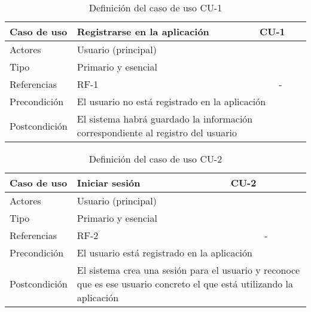 \begin{table}[H]
    \begin{tabular}{|p{3cm}|p{5cm}|p{2cm}|}
        \hline
        Caso de uso & Registrarse en la aplicación & CU-1 \\
        \hline
        Actores & \multicolumn{2}{|p{7cm}|}{Usuario (principal)} \\
        \hline
        Tipo & \multicolumn{2}{|p{7cm}|}{Primario y esencial} \\
        \hline
        Referencias & RF-1 & \multicolumn{1}{|c|}{-} \\
        \hline
        Precondición & \multicolumn{2}{|p{7cm}|}{El usuario no está registrado
        en la aplicación} \\
        \hline
        Postcondición & \multicolumn{2}{|p{7cm}|}{El sistema habrá guardado la
        información correspondiente al registro del usuario} \\
        \hline
    \end{tabular}
    \caption{Definición del caso de uso CU-1}
    \label{tab:cu_1}
\end{table}

\begin{table}[H]
    \begin{tabular}{|p{3cm}|p{5cm}|p{2cm}|}
        \hline
        Caso de uso & Iniciar sesión & CU-2 \\
        \hline
        Actores & \multicolumn{2}{|p{7cm}|}{Usuario (principal)} \\
        \hline
        Tipo & \multicolumn{2}{|p{7cm}|}{Primario y esencial} \\
        \hline
        Referencias & RF-2 & \multicolumn{1}{|c|}{-} \\
        \hline
        Precondición & \multicolumn{2}{|p{7cm}|}{El usuario está registrado
        en la aplicación} \\
        \hline
        Postcondición & \multicolumn{2}{|p{7cm}|}{El sistema crea una sesión para
        el usuario y reconoce que es ese usuario concreto el que está utilizando la aplicación} \\
        \hline
    \end{tabular}
    \caption{Definición del caso de uso CU-2}
    \label{tab:cu_2}
\end{table}

